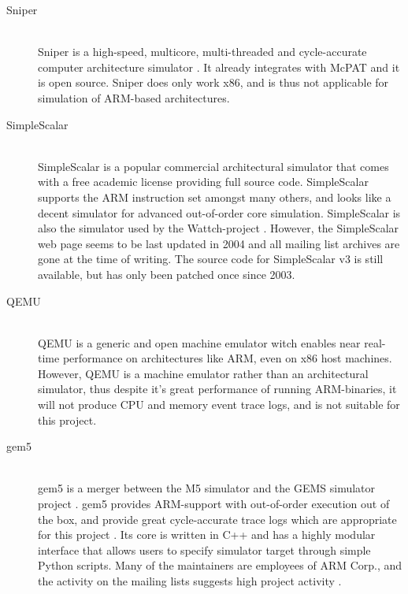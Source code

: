 \begin{description}
\item[Sniper] \hfill\\
    Sniper is a high-speed, multicore, multi-threaded and cycle-accurate
    computer architecture simulator \cite{sniperwebpage,carlson2013ssomta}. It
    already integrates with McPAT and it is open source. Sniper does only work
    x86, and is thus not applicable for simulation of ARM-based architectures.

\item[SimpleScalar] \hfill\\
    SimpleScalar is a popular commercial architectural simulator that comes with
    a free academic license providing full source code. SimpleScalar supports
    the ARM instruction set amongst many others, and looks like a decent
    simulator for advanced out-of-order core simulation. SimpleScalar is also
    the simulator used by the Wattch-project \cite{brooks2000wattch}. However,
    the SimpleScalar web page seems to be last updated in 2004 and all mailing
    list archives are gone at the time of writing. The source code for
    SimpleScalar v3 is still available, but has only been patched once since
    2003.

\item[QEMU]\hfill\\
    QEMU is a generic and open machine emulator witch enables near real-time
    performance on architectures like ARM, even on x86 host machines. However,
    QEMU is a machine emulator rather than an architectural simulator, thus
    despite it's great performance of running ARM-binaries, it will not produce
    CPU and memory event trace logs, and is not suitable for this project.

\item[gem5]\hfill\\
    gem5 is a merger between the M5 simulator \cite{binkert2006m5} and the GEMS
    simulator project \cite{GEMS}. gem5 provides ARM-support with out-of-order
    execution out of the box, and provide great cycle-accurate trace logs which
    are appropriate for this project \cite{gem5simulator}. Its core is written
    in C++ and has a highly modular interface that allows users to specify
    simulator target through simple Python scripts. Many of the maintainers are
    employees of ARM Corp., and the activity on the mailing lists suggests high
    project activity \cite{gem5dev}.
\end{description}

